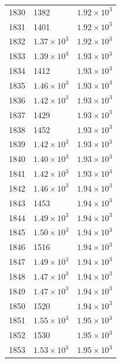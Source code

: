 \begin{table}[H]
\begin{tabular}{lll}
1830 & 1382 & $\displaystyle 1.92 \times 10^{3}$ \\
1831 & 1401 & $\displaystyle 1.92 \times 10^{3}$ \\
1832 & $\displaystyle 1.37 \times 10^{3}$ & $\displaystyle 1.92 \times 10^{3}$ \\
1833 & $\displaystyle 1.39 \times 10^{3}$ & $\displaystyle 1.93 \times 10^{3}$ \\
1834 & 1412 & $\displaystyle 1.93 \times 10^{3}$ \\
1835 & $\displaystyle 1.46 \times 10^{3}$ & $\displaystyle 1.93 \times 10^{3}$ \\
1836 & $\displaystyle 1.42 \times 10^{3}$ & $\displaystyle 1.93 \times 10^{3}$ \\
1837 & 1429 & $\displaystyle 1.93 \times 10^{3}$ \\
1838 & 1452 & $\displaystyle 1.93 \times 10^{3}$ \\
1839 & $\displaystyle 1.42 \times 10^{3}$ & $\displaystyle 1.93 \times 10^{3}$ \\
1840 & $\displaystyle 1.40 \times 10^{3}$ & $\displaystyle 1.93 \times 10^{3}$ \\
1841 & $\displaystyle 1.42 \times 10^{3}$ & $\displaystyle 1.93 \times 10^{3}$ \\
1842 & $\displaystyle 1.46 \times 10^{3}$ & $\displaystyle 1.94 \times 10^{3}$ \\
1843 & 1453 & $\displaystyle 1.94 \times 10^{3}$ \\
1844 & $\displaystyle 1.49 \times 10^{3}$ & $\displaystyle 1.94 \times 10^{3}$ \\
1845 & $\displaystyle 1.50 \times 10^{3}$ & $\displaystyle 1.94 \times 10^{3}$ \\
1846 & 1516 & $\displaystyle 1.94 \times 10^{3}$ \\
1847 & $\displaystyle 1.49 \times 10^{3}$ & $\displaystyle 1.94 \times 10^{3}$ \\
1848 & $\displaystyle 1.47 \times 10^{3}$ & $\displaystyle 1.94 \times 10^{3}$ \\
1849 & $\displaystyle 1.47 \times 10^{3}$ & $\displaystyle 1.94 \times 10^{3}$ \\
1850 & 1520 & $\displaystyle 1.94 \times 10^{3}$ \\
1851 & $\displaystyle 1.55 \times 10^{3}$ & $\displaystyle 1.95 \times 10^{3}$ \\
1852 & 1530 & $\displaystyle 1.95 \times 10^{3}$ \\
1853 & $\displaystyle 1.53 \times 10^{3}$ & $\displaystyle 1.95 \times 10^{3}$ \\

\end{tabular}
\end{table}
